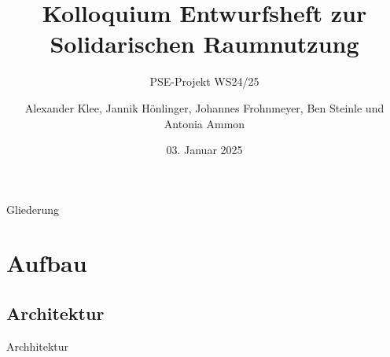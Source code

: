 \documentclass{sdqbeamer}
\title[Solidarische Raumnutzung Entwurfsheft]{Kolloquium Entwurfsheft zur Solidarischen Raumnutzung}
\author[Soli-Gruppe]{Alexander Klee, Jannik Hönlinger, Johannes Frohnmeyer, Ben Steinle und Antonia Ammon }
\subtitle{PSE-Projekt WS24/25}
\date[03.\,01.\,2025]{03. Januar 2025}
\begin{document}
 
\KITtitleframe

\begin{frame}{Gliederung}
\tableofcontents
\end{frame}

\section{Aufbau}

\subsection{Architektur}
\begin{frame}{Archhitektur}

\end{frame}
\end{document}
